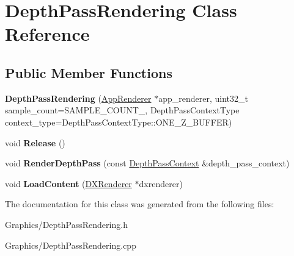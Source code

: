 \hypertarget{classDepthPassRendering}{}\section{Depth\+Pass\+Rendering Class Reference}
\label{classDepthPassRendering}
\subsection*{Public Member Functions}
\begin{DoxyCompactItemize}
\item 
\mbox{\label{classDepthPassRendering_a5de01c4fdd9c767988dd2734fc5ecf08}} 
{\bfseries Depth\+Pass\+Rendering} (\hyperlink{classAppRenderer}{App\+Renderer} $\ast$app\+\_\+renderer, uint32\+\_\+t sample\+\_\+count=S\+A\+M\+P\+L\+E\+\_\+\+C\+O\+U\+N\+T\+\_, Depth\+Pass\+Context\+Type context\+\_\+type=Depth\+Pass\+Context\+Type\+::\+O\+N\+E\+\_\+\+Z\+\_\+\+B\+U\+F\+F\+ER)
\item 
\mbox{\label{classDepthPassRendering_a1743eafbae36e167f4f9d2b14b389b78}} 
void {\bfseries Release} ()
\item 
\mbox{\label{classDepthPassRendering_a8b8dc9454d54ed5df82f38f766b8d82e}} 
void {\bfseries Render\+Depth\+Pass} (const \hyperlink{structDepthPassContext}{Depth\+Pass\+Context} \&depth\+\_\+pass\+\_\+context)
\item 
\mbox{\label{classDepthPassRendering_ad06737de9e708a8749e6c46a6a054997}} 
void {\bfseries Load\+Content} (\hyperlink{classDXRenderer}{D\+X\+Renderer} $\ast$dxrenderer)
\end{DoxyCompactItemize}


The documentation for this class was generated from the following files\+:\begin{DoxyCompactItemize}
\item 
Graphics/Depth\+Pass\+Rendering.\+h\item 
Graphics/Depth\+Pass\+Rendering.\+cpp\end{DoxyCompactItemize}
